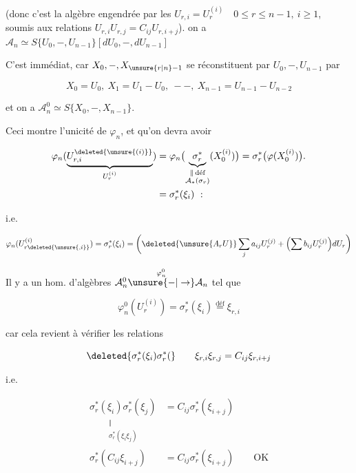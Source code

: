 
 (donc c'est la algèbre engendrée par les $U_{r,i}=U_r^{(i)}\quad 0\leq r\leq n-1,\ i\geq1$, soumis aux relations $U_{r,i}U_{r,j}=C_{ij}U_{r,i+j}$).  on a $\mathcal A_n\simeq S\{U_0,-,U_{n-1}\}[dU_0,-,dU_{n-1}]$

C'est immédiat, car $X_0,-,X_{\unsure{r|n}-1}$ se réconstituent par $U_0,-,U_{n-1}$ par

\[
X_0=U_0,\ X_1=U_1-U_0,\ --,\ X_{n-1}=U_{n-1}-U_{n-2}
\]

et on a $\mathcal A_n^0\simeq S\{X_0,-,X_{n-1}\}$. 

Ceci montre l'unicité de $\varphi_n$, et qu'on devra avoir

\[
\begin{aligned}
\varphi_n(\underbrace{U_{r,i}^{\deleted{\unsure{(i)}}}}_{U_r^{(i)}})
 &=\varphi_n\bigl(\underbrace{\sigma_r^*}_{\substack{\Vert\,\text{déf}\\\mathcal A_*(\sigma_r)}}(X_0^{(i)})\bigr)
 =\sigma_r^*\bigl(\varphi(X_0^{(i)})\bigr).\\
 &=\sigma_r^*(\xi_i)\ :
\end{aligned}
\]

i.e.

\[
\varphi_n(U_{r\deleted{\unsure{,i}}}^{(i)})=\sigma_r^*(\xi_i)
=\biggl(\deleted{\unsure{A_r U}}\sum_j a_{ij}U_r^{(j)}+\Bigl(\sum b_{ij}U_r^{(j)}\Bigr)dU_r\biggr)
\]

Il y a  un hom. d'algèbres  $\mathcal A_n^0\overset{\varphi_n^0}{\unsure{-|\to}}\mathcal A_n$ tel que

\[
\varphi_n^0(U_r^{(i)})=\sigma_r^*(\xi_i)\overset{\text{déf}}{=}\xi_{r,i}
\]

car cela revient à vérifier les relations

\[
\deleted{\sigma_r^*(\xi_i)\sigma_r^*(}\qquad
\xi_{r,i}\xi_{r,j}=C_{ij}\xi_{r,i+j}
\]

i.e.

\[
\begin{aligned}
\underset{\substack{\Vert\\\sigma_r^*(\xi_i\xi_j)}}{\sigma_r^*(\xi_i)\sigma_r^*(\xi_j)}&=C_{ij}\sigma_r^*(\xi_{i+j})\\
\sigma_r^*(C_{ij}\xi_{i+j})&=C_{ij}\sigma_r^*(\xi_{i+j})\qquad\mathrm{OK}
\end{aligned}
\]

